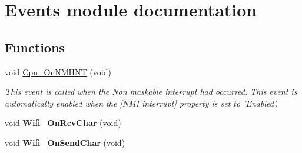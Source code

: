 \hypertarget{group___events__module}{\section{Events module documentation}
\label{group___events__module}
}
\subsection*{Functions}
\begin{DoxyCompactItemize}
\item 
\hypertarget{group___events__module_ga960d094664356278ac5472d45a6ea2f3}{void \hyperlink{group___events__module_ga960d094664356278ac5472d45a6ea2f3}{Cpu\-\_\-\-On\-N\-M\-I\-I\-N\-T} (void)}\label{group___events__module_ga960d094664356278ac5472d45a6ea2f3}

\begin{DoxyCompactList}\small\item\em This event is called when the Non maskable interrupt had occurred. This event is automatically enabled when the \mbox{[}N\-M\-I interrupt\mbox{]} property is set to 'Enabled'. \end{DoxyCompactList}\item 
\hypertarget{group___events__module_gacd0b980f9c9fa0a80fb4270302419bc8}{void {\bfseries Wifi\-\_\-\-On\-Rcv\-Char} (void)}\label{group___events__module_gacd0b980f9c9fa0a80fb4270302419bc8}

\item 
\hypertarget{group___events__module_gaa6bfc23f0cd4af958ea778b3e8819d2a}{void {\bfseries Wifi\-\_\-\-On\-Send\-Char} (void)}\label{group___events__module_gaa6bfc23f0cd4af958ea778b3e8819d2a}


\end{DoxyCompactItemize}
